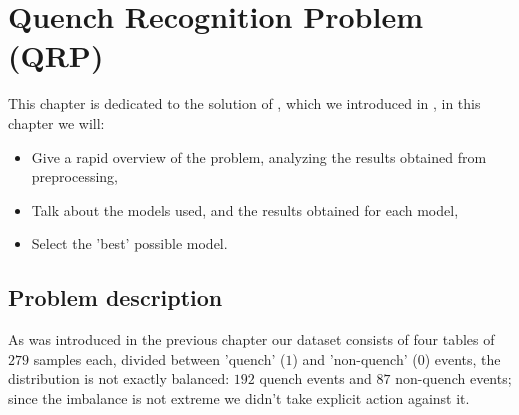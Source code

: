 \chapter{Quench Recognition Problem (QRP)}
\label{chp:qrp}
This chapter is dedicated to the solution of \qrp, which we introduced in , in this chapter we will:
\begin{itemize}
	\item Give a rapid overview of the problem, analyzing the results obtained from
	      preprocessing,
	\item Talk about the models used, and the results obtained for each model,
	\item Select the 'best' possible model.
\end{itemize}

\section{Problem description}
As was introduced in the previous chapter our dataset consists of four tables of $279$ samples
each, divided between 'quench' ($1$) and 'non-quench' ($0$) events, the distribution is not exactly balanced: $192$ quench events and $87$ non-quench events; since the imbalance is not extreme we didn't take explicit action against it.

